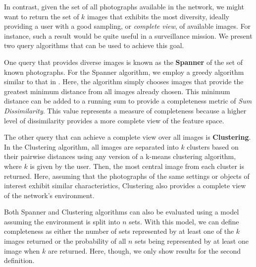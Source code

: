 In contrast, given the set of all photographs available in the network, we might want to return the set of $k$ images that exhibits the most diversity, ideally providing a user with a good sampling, or \emph{complete view}, of available images.  For instance, such a result would be quite useful in a surveillance mission.  We present two query algorithms that can be used to achieve this goal.

One query that provides diverse images is known as the {\bf Spanner} of the set of known photographs.  For the Spanner algorithm, we employ a greedy algorithm similar to that in \cite{mediascope}.  Here, the algorithm simply chooses images that provide the greatest minimum distance from all images already chosen.  This minimum distance can be added to a running sum to provide a completeness metric of \emph{Sum Dissimilarity}.  This value represents a measure of completeness because a higher level of dissimilarity provides a more complete view of the feature space.


The other query that can achieve a complete view over all images is {\bf Clustering}.  In the Clustering algorithm, all images are separated into $k$ clusters based on their pairwise distances using any version of a k-means clustering algorithm, where $k$ is given by the user.  Then, the most central image from each cluster is returned.  
Here, assuming that the photographs of the same settings or objects of interest exhibit similar characteristics, 
Clustering also provides a complete view of the network's environment.

Both Spanner and Clustering algorithms can also be evaluated using a model assuming the environment is split into $n$ sets.  With this model, we can define completeness as either the number of sets represented by at least one of the $k$ images returned or the probability of all $n$ sets being represented by at least one image when $k$ are returned.  Here, though, we only show results for the second definition.

